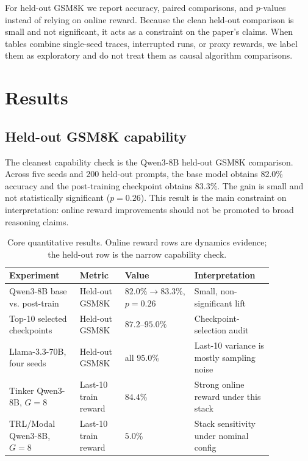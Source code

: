 \documentclass[runningheads,a4paper]{llncs}
\begin{document}
For held-out GSM8K we report accuracy, paired comparisons, and $p$-values
instead of relying on online reward. Because the clean held-out comparison is
small and not significant, it acts as a constraint on the paper's claims.
When tables combine single-seed traces, interrupted runs, or proxy rewards, we
label them as exploratory and do not treat them as causal algorithm
comparisons.

\section{Results}
\label{sec:results}

\subsection{Held-out GSM8K capability}

The cleanest capability check is the Qwen3-8B held-out GSM8K comparison.
Across five seeds and 200 held-out prompts, the base model obtains 82.0\%
accuracy and the post-training checkpoint obtains 83.3\%. The gain is small
and not statistically significant ($p=0.26$). This result is the main
constraint on interpretation: online reward improvements should not be
promoted to broad reasoning claims.

\begin{table}[t]
\centering
\caption{Core quantitative results. Online reward rows are dynamics evidence;
the held-out row is the narrow capability check.}
\label{tab:core_results}
\small
\begin{tabular}{p{0.25\linewidth}p{0.16\linewidth}p{0.17\linewidth}p{0.28\linewidth}}
\toprule
\textbf{Experiment} & \textbf{Metric} & \textbf{Value} & \textbf{Interpretation} \\
\midrule
Qwen3-8B base vs. post-train & Held-out GSM8K & $82.0\%\to83.3\%$, $p=0.26$ & Small, non-significant lift \\
Top-10 selected checkpoints & Held-out GSM8K & $87.2$--$95.0\%$ & Checkpoint-selection audit \\
Llama-3.3-70B, four seeds & Held-out GSM8K & all $95.0\%$ & Last-10 variance is mostly sampling noise \\
Tinker Qwen3-8B, $G=8$ & Last-10 train reward & $84.4\%$ & Strong online reward under this stack \\
TRL/Modal Qwen3-8B, $G=8$ & Last-10 train reward & $5.0\%$ & Stack sensitivity under nominal config \\
\bottomrule
\end{tabular}
\end{table}
\end{document}
